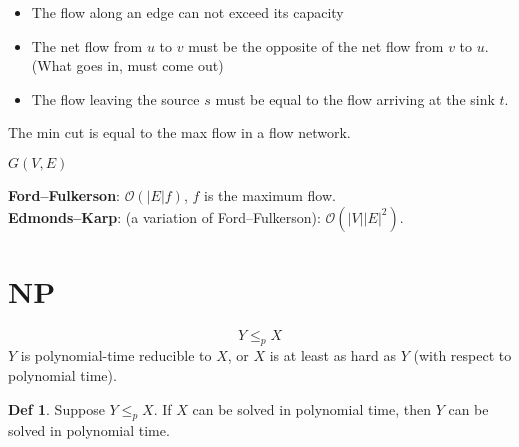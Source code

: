 \documentclass[a4paper,landscape]{article}
\theoremstyle{definition}
\newtheorem*{definition}{Def}
\begin{document}
\begin{multicols*}{3}

\begin{itemize}
	\item The flow along an edge can not exceed its capacity
	\item The net flow from $u$ to $v$ must be the opposite of the net flow
		from $v$ to $u$. (What goes in, must come out)
	\item The flow leaving the source $s$ must be equal to the flow
		arriving at the sink $t$.
\end{itemize}

The min cut is equal to the max flow in a flow network.

$G(V, E)$

\textbf{Ford--Fulkerson}:
$\mathcal{O}(\vert{E}\vert f)$, $f$ is the maximum flow. \\
\textbf{Edmonds--Karp}: (a variation of Ford--Fulkerson):
$\mathcal{O}(\vert{V}\vert \vert{E}\vert^2)$.



\section{NP}
$$ Y \leq_p X $$
$Y$ is polynomial-time reducible to $X$, or $X$ is at least as hard as
$Y$ (with respect to polynomial time).

\begin{definition}
	Suppose $Y \leq_p X$. If $X$ can be solved in polynomial time, then $Y$
	can be solved in polynomial time.
\end{definition}


\end{multicols*}
\end{document}
